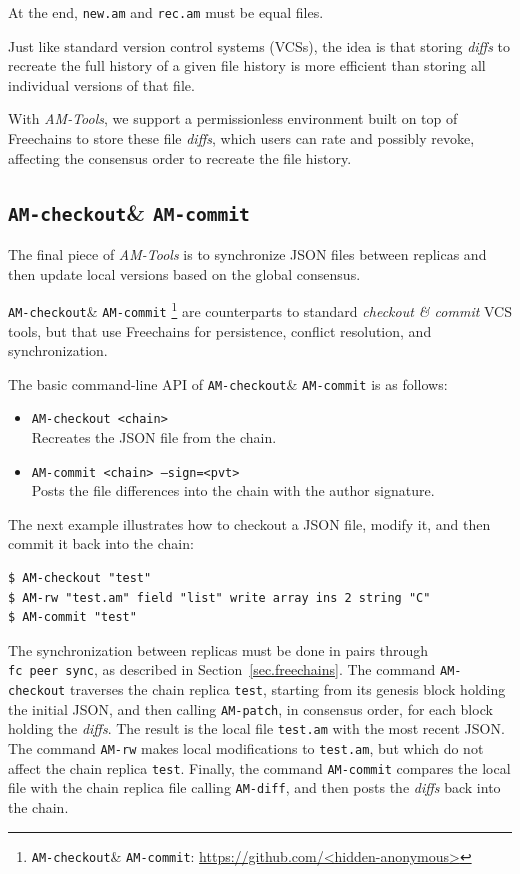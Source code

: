 \documentclass[12pt]{article}
\newcommand{\AMT}      {\emph{AM-Tools}\xspace}
\newcommand{\code}[1]  {\texttt{\footnotesize{#1}}}
\newcommand{\amcheckout} {\texttt{AM-checkout}\xspace}
\newcommand{\amcommit}   {\texttt{AM-commit}\xspace}
\begin{document}
At the end, \code{new.am} and \code{rec.am} must be equal files.

Just like standard version control systems (VCSs), the idea is that storing
\emph{diffs} to recreate the full history of a given file history is more
efficient than storing all individual versions of that file.

With \AMT, we support a permissionless environment built on top of Freechains
to store these file \emph{diffs}, which users can rate and possibly revoke,
affecting the consensus order to recreate the file history.

\subsection{\amcheckout \& \amcommit}

The final piece of \AMT is to synchronize JSON files between replicas
and then update local versions based on the global consensus.

\amcheckout \& \amcommit%
    \footnote{\amcheckout \& \amcommit: \url{https://github.com/<hidden-anonymous>}}
are counterparts to standard \emph{checkout \& commit} VCS tools, but that use
Freechains for persistence, conflict resolution, and synchronization.

The basic command-line API of \amcheckout \& \amcommit is as follows:

\begin{itemize}
\item \code{AM-checkout <chain>} \\
    Recreates the JSON file from the chain.
\item \code{AM-commit <chain> --sign=<pvt>} \\
    Posts the file differences into the chain with the author signature.
\end{itemize}

The next example illustrates how to checkout a JSON file, modify it, and then
commit it back into the chain:

{\footnotesize
\begin{verbatim}
$ AM-checkout "test"
$ AM-rw "test.am" field "list" write array ins 2 string "C"
$ AM-commit "test"
\end{verbatim}
}

The synchronization between replicas must be done in pairs through
\code{fc~peer~sync}, as described in Section~\ref{sec.freechains}.
%
The command \code{AM-checkout} traverses the chain replica \code{test},
starting from its genesis block holding the initial JSON, and then calling
\code{AM-patch}, in consensus order, for each block holding the \emph{diffs}.
The result is the local file \code{test.am} with the most recent JSON.
%
The command \code{AM-rw} makes local modifications to \code{test.am}, but which
do not affect the chain replica \code{test}.
%
Finally, the command \code{AM-commit} compares the local file with the chain
replica file calling \code{AM-diff}, and then posts the \emph{diffs} back into
the chain.
\end{document}

